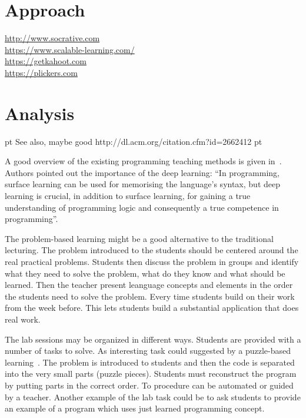 \documentclass{article}
\begin{document}
\section{Approach} %
\label{sec:plan}

\url{http://www.socrative.com}\\
\url{https://www.scalable-learning.com/}\\ %
\url{https://getkahoot.com}\\
\url{https://plickers.com}

\section{Analysis} %
\label{sec:analysis}



 pt
See also, maybe good
http://dl.acm.org/citation.cfm?id=2662412
 pt


A good overview of the existing programming teaching methods is given
in~\cite{mohorovivcic2011overview}. Authors pointed out the importance
of the deep learning: ``In programming, surface learning can be used
for memorising the language’s syntax, but deep learning is crucial, in
addition to surface learning, for gaining a true understanding of
programming logic and consequently a true competence in
programming''.

The problem-based learning might be a good alternative to the
traditional lecturing.  The problem introduced to the students should
be centered around the real practical problems. Students then discuss
the problem in groups and identify what they need to solve the
problem, what do they know and what should be learned. Then the
teacher present leanguage concepts and elements in the order the
students need to solve the problem. Every time students build
on their work from the week before. This lets students build a
substantial application that does real work.


The lab sessions may be organized in different ways. Students are
provided with a number of tasks to solve. As interesting task could
suggested by a puzzle-based
learning~\cite{mohorovivcic2011overview}. The problem is introduced to
students and then the code is separated into the very small parts
(puzzle pieces). Students must reconstruct the program by putting
parts in the correct order. To procedure can be automated or guided by
a teacher. Another example of the lab task could be to ask students to
provide an example of a program which uses just learned programming
concept.
\end{document}
